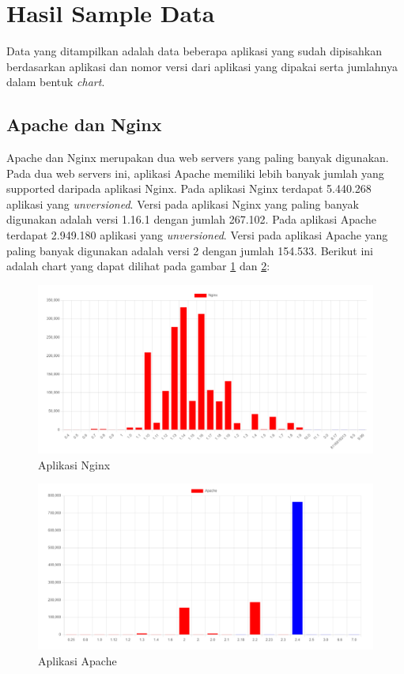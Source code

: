 \section{Hasil Sample Data}
Data yang ditampilkan adalah data beberapa aplikasi yang sudah dipisahkan berdasarkan aplikasi dan nomor versi dari aplikasi yang dipakai serta jumlahnya dalam bentuk \textit{chart}.

\subsection{Apache dan Nginx}
Apache dan Nginx merupakan dua web servers yang paling banyak digunakan. Pada dua web servers ini, aplikasi Apache memiliki lebih banyak jumlah yang supported daripada aplikasi Nginx. Pada aplikasi Nginx terdapat 5.440.268 aplikasi yang \textit{unversioned}. Versi pada aplikasi Nginx yang paling banyak digunakan adalah versi 1.16.1 dengan jumlah 267.102. Pada aplikasi Apache terdapat 2.949.180 aplikasi yang \textit{unversioned}. Versi pada aplikasi Apache yang paling banyak digunakan adalah versi 2 dengan jumlah 154.533. Berikut ini adalah chart yang dapat dilihat pada gambar \ref{fig:data_sample_nginx} dan \ref{fig:data_sample_apache}:
\begin{figure}[H]
	\centering  
	\includegraphics[scale=0.4]{Gambar/data_sample_nginx.png}  
	\caption{Aplikasi Nginx} 
	\label{fig:data_sample_nginx} 
\end{figure}

\begin{figure}[H]
	\centering  
	\includegraphics[scale=0.4]{Gambar/apache.png}  
	\caption{Aplikasi Apache} 
	\label{fig:data_sample_apache} 
\end{figure}

